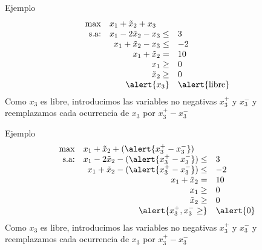 \documentclass[10pt, aspectratio=169]{beamer}
\begin{document}
    \begin{frame}{Ejemplo}
        \[\begin{array}{rrl}
              \max & \multicolumn{2}{l}{x_1 + \tilde{x}_2 + x_3} \\
              \text{s.a:} & x_1 - 2\tilde{x}_2 - x_3 \leq & 3                    \\
              & x_1 + \tilde{x}_2 - x_3 \leq  & -2                   \\
              & x_1 + \tilde{x}_2 =           & 10                   \\
              & x_1\geq                       & 0                    \\
              & \tilde{x}_2 \geq              & 0                    \\
              & \alert{x_3}                   & \alert{\text{libre}}
        \end{array}
        \]
        Como $x_3$ es libre, introducimos las variables no negativas $x_3^+$ y $x_3^-$ y reemplazamos cada ocurrencia de
        $x_3$ por $x_3^+-x_3^-$
    \end{frame}

    \begin{frame}{Ejemplo}
        \[\begin{array}{rrl}
              \max & \multicolumn{2}{l}{x_1 + \tilde{x}_2 + (\alert{x_3^+-x_3^-})} \\
              \text{s.a:} & x_1 - 2\tilde{x}_2 - (\alert{x_3^+-x_3^-}) \leq & 3         \\
              & x_1 + \tilde{x}_2 - (\alert{x_3^+-x_3^-}) \leq  & -2        \\
              & x_1 + \tilde{x}_2 =                             & 10        \\
              & x_1\geq                                         & 0         \\
              & \tilde{x}_2 \geq                                & 0         \\
              & \alert{x_3^+ ,x_3^- \geq}                       & \alert{0}
        \end{array}
        \]
        Como $x_3$ es libre, introducimos las variables no negativas $x_3^+$ y $x_3^-$ y reemplazamos cada ocurrencia de
        $x_3$ por $x_3^+-x_3^-$
    \end{frame}
\end{document}
